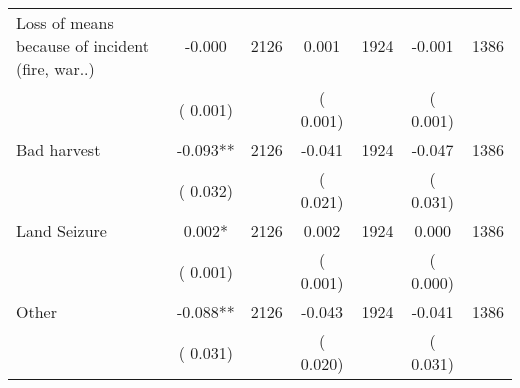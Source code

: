 \begin{tabular}{l*{6}{c}}
Loss of means because of incident (fire, war..)        &             -0.000      &       2126       &              0.001      &       1924       &             -0.001      &       1386       \\
                       &       (       0.001)            &                               &       (       0.001)            &                               &       (       0.001)            &                               \\
Bad harvest        &             -0.093**      &       2126       &             -0.041      &       1924       &             -0.047      &       1386       \\
                       &       (       0.032)            &                               &       (       0.021)            &                               &       (       0.031)            &                               \\
Land Seizure        &              0.002*      &       2126       &              0.002      &       1924       &              0.000      &       1386       \\
                       &       (       0.001)            &                               &       (       0.001)            &                               &       (       0.000)            &                               \\
Other        &             -0.088**      &       2126       &             -0.043      &       1924       &             -0.041      &       1386       \\
                       &       (       0.031)            &                               &       (       0.020)            &                               &       (       0.031)            &                               \\
\hline \end{tabular}